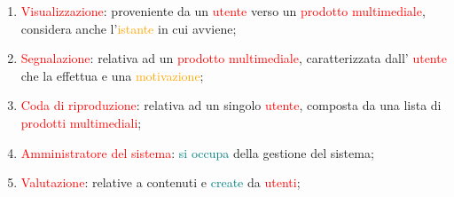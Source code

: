 \begin{enumerate}
    \item \textcolor{red}{Visualizzazione}: proveniente da un \textcolor{red}{utente} verso un \textcolor{red}{prodotto multimediale},
    considera anche l'\textcolor{orange}{istante} in cui avviene;
    \item \textcolor{red}{Segnalazione}: relativa ad un \textcolor{red}{prodotto multimediale}, caratterizzata dall' \textcolor{red}{utente} che 
    la effettua e una \textcolor{orange}{motivazione};
    \item \textcolor{red}{Coda di riproduzione}: relativa ad un singolo \textcolor{red}{utente}, composta da una lista di  
    \textcolor{red}{prodotti multimediali};
    \item \textcolor{red}{Amministratore del sistema}: \textcolor{teal}{si occupa} della gestione del sistema;
    \item \textcolor{red}{Valutazione}: relative a contenuti e \textcolor{teal}{create} da \textcolor{red}{utenti};
\end{enumerate}


